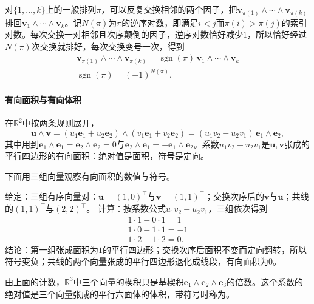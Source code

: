 对$\{1,\ldots,k\}$上的一般排列$\pi$，可以反复交换相邻的两个因子，把$\bm v_{\pi(1)}\wedge\cdots\wedge\bm v_{\pi(k)}$排回$\bm v_1\wedge\cdots\wedge\bm v_k$。记$N(\pi)$为$\pi$的逆序对数，即满足$i<j$而$\pi(i)>\pi(j)$的索引对数。每次交换一对相邻且次序颠倒的因子，逆序对数恰好减少$1$，所以恰好经过$N(\pi)$次交换就排好，每次交换变号一次，得到
\[
 \begin{gathered}
\bm v_{\pi(1)}\wedge\cdots\wedge\bm v_{\pi(k)}
 =\operatorname{sgn}(\pi)\,\bm v_1\wedge\cdots\wedge\bm v_k\\
\operatorname{sgn}(\pi)=(-1)^{N(\pi)}.
 \end{gathered}
\]

\paragraph{有向面积与有向体积}
在$\mathbb R^2$中按两条规则展开，
\[
 \bm u\wedge\bm v
 =(u_1\bm e_1+u_2\bm e_2)\wedge(v_1\bm e_1+v_2\bm e_2)
 =(u_1v_2-u_2v_1)\,\bm e_1\wedge\bm e_2,
\]
其中用到$\bm e_1\wedge\bm e_1=\bm e_2\wedge\bm e_2=0$与$\bm e_2\wedge\bm e_1=-\bm e_1\wedge\bm e_2$。系数$u_1v_2-u_2v_1$是$\bm u,\bm v$张成的平行四边形的有向面积：绝对值是面积，符号是定向。

下面用三组向量观察有向面积的数值与符号。
\begin{example}[平面上的有向面积]
\label{ex:ls-oriented-area}
给定：三组有序向量对：$\bm u=(1,0)^\top$与$\bm v=(1,1)^\top$；交换次序后的$\bm v$与$\bm u$；共线的$(1,1)^\top$与$(2,2)^\top$。
计算：按系数公式$u_1v_2-u_2v_1$，三组依次得到
\[
 \begin{gathered}
1\cdot1-0\cdot1=1\\
1\cdot0-1\cdot1=-1\\
1\cdot2-1\cdot2=0.
 \end{gathered}
\]
结论：第一组张成面积为$1$的平行四边形；交换次序后面积不变而定向翻转，所以符号变负；共线的两个向量张成的平行四边形退化成线段，有向面积为$0$。
\end{example}
由上面的计数，$\mathbb R^3$中三个向量的楔积只是基楔积$\bm e_1\wedge\bm e_2\wedge\bm e_3$的倍数。这个系数的绝对值是三个向量张成的平行六面体的体积，带符号时称为。

